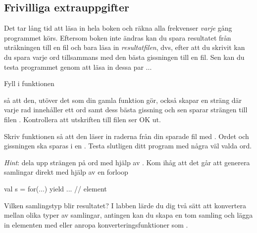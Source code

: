 \subsection{Frivilliga extrauppgifter}
Det tar lång tid att läsa in hela boken och räkna alla frekvenser \emph{varje} gång programmet körs. Eftersom boken inte ändras kan du spara resultatet från uträkningen till en fil och bara läsa in \emph{resultatfilen}, dvs, efter att du skrivit  kan du spara varje ord tillsammans med den bästa gissningen till en fil. Sen kan du testa programmet genom att läsa in dessa par ...

\Subtask Fyll i funktionen 
\begin{CodeSmall}
def readBook(bookFile: String, saveToFile: String)} 
\end{CodeSmall}
så att den, utöver det som din gamla funktion gör, också skapar en sträng där varje rad innehåller ett ord samt dess bästa gissning och sen sparar strängen till filen . Kontrollera att utskriften till filen ser OK ut. 

\Subtask Skriv funktionen  så att den läser in raderna från din sparade fil med . Ordet och gissningen ska sparas i en .  Testa slutligen ditt program med några väl valda ord.

\emph{Hint}: dela upp strängen på ord med hjälp av . Kom ihåg att det går att generera samlingar direkt med hjälp av en forloop \begin{CodeSmall}
val s = for(...) yield{
...
// element
}

\end{CodeSmall} 
Vilken samlingstyp blir resultatet? I labben lärde du dig två sätt att konvertera mellan olika typer av samlingar, antingen kan du skapa en tom samling  och lägga in elementen med \code{++} eller anropa konverteringsfunktioner som . 
 


    
